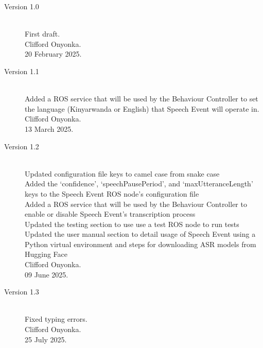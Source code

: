 \documentclass{CSSRforAfrica}
\begin{document}
\begin{description}

\item [Version 1.0]~\\
First draft. \\
Clifford Onyonka. \\                                     %
20 February 2025.                                                        %

\item [Version 1.1]~\\
Added a ROS service that will be used by the Behaviour Controller to set the language (Kinyarwanda or English) that Speech Event will operate in. \\
Clifford Onyonka. \\
13 March 2025.

\item [Version 1.2]~\\
Updated configuration file keys to camel case from snake case \\
Added the `confidence', `speechPausePeriod', and `maxUtteranceLength' keys to the Speech Event ROS node's configuration file \\
Added a ROS service that will be used by the Behaviour Controller to enable or disable Speech Event's transcription process \\
Updated the testing section to use use a test ROS node to run tests \\
Updated the user manual section to detail usage of Speech Event using a Python virtual environment and steps for downloading ASR models from Hugging Face \\
Clifford Onyonka. \\
09 June 2025.

\item [Version 1.3]~\\
Fixed typing errors.\\
Clifford Onyonka. \\
25 July 2025.



\end{description}
\end{document}
